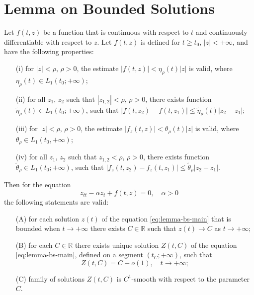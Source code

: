 \appendix
\renewcommand\thechapter{\Alph{chapter}}

\chapter{Lemma on Bounded Solutions}
\label{appendix:lemma-on-bounded-solutions}

\begin{lemma*}
	Let $f(t, z)$ be a function that is continuous with respect to $t$ and continuously differentiable with respect to $z$.
	Let $f(t, z)$ is defined for $t \ge t_0$, $|z| < +\infty$, and have the following properties:
	\begin{itemize}
		\item[(i)] for $|z| < \rho$, $\rho > 0$, the estimate $|f(t, z)| < \eta_{\rho}(t)|z|$ is valid, where $\eta_{\rho}(t) \in L_1(t_0; +\infty)$;
		\item[(ii)] for all $z_1$, $z_2$ such that $|z_{1,2}| < \rho$, $\rho > 0$, there exists function $\tilde{\eta}_{\rho}(t) \in L_1(t_0; +\infty)$, such that $|f(t, z_2) - f(t, z_1)| \le \tilde{\eta}_{\rho}(t) |z_2 - z_1|$;
		\item[(iii)] for $|z| < \rho$, $\rho > 0$, the estimate $|f_z(t, z)| < \theta_{\rho}(t) |z|$ is valid, where $\theta_{\rho} \in L_1(t_0, +\infty)$;
		\item[(iv)] for all $z_1$, $z_2$ such that $z_{1,2} < \rho$, $\rho > 0$, there exists function $\tilde{\theta}_{\rho} \in L_1(t_0; +\infty)$, such that $|f_z(t, z_2) - f_z(t, z_1)| \le \tilde{\theta}_{\rho} |z_2 - z_1|$.
	\end{itemize}
	Then for the equation
	\begin{equation}
		z_{tt} - \alpha z_t + f(t, z) = 0, \quad \alpha > 0
		\label{eq:lemma-bs-main}
	\end{equation}
	the following statements are valid:
	\begin{itemize}
		\item[(A)] for each solution $z(t)$ of the equation \eqref{eq:lemma-bs-main} that is bounded when $t \to +\infty$ there exists $C \in \mathbb{R}$ such that $z(t) \to C$ as $t \to +\infty$;
		\item[(B)] for each $C \in \mathbb{R}$ there exists unique solution $Z(t, C)$ of the equation \eqref{eq:lemma-bs-main}, defined on a segment $(t_C; +\infty)$, such that
		\begin{equation}
			Z(t, C) = C + o(1), \quad t \to +\infty;
		\end{equation}
		\item[(C)] family of solutions $Z(t, C)$ is $C^1$-smooth with respect to the parameter $C$.
	\end{itemize}
\end{lemma*}
